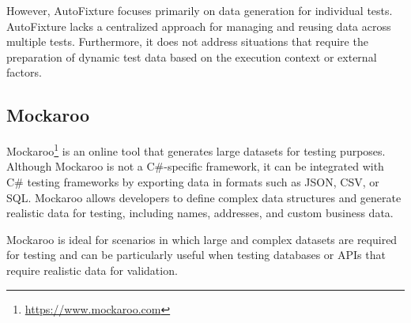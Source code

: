 However, AutoFixture focuses primarily on data generation for individual tests. AutoFixture lacks a centralized approach for managing and reusing data across multiple tests. Furthermore, it does not address situations that require the preparation of dynamic test data based on the execution context or external factors.

\subsection{Mockaroo}

Mockaroo\footnote{\href{https://www.mockaroo.com}{https://www.mockaroo.com}} is an online tool that generates large datasets for testing purposes. Although Mockaroo is not a C\#-specific framework, it can be integrated with C\# testing frameworks by exporting data in formats such as JSON, CSV, or SQL. Mockaroo allows developers to define complex data structures and generate realistic data for testing, including names, addresses, and custom business data.

Mockaroo is ideal for scenarios in which large and complex datasets are required for testing and can be particularly useful when testing databases or APIs that require realistic data for validation.

